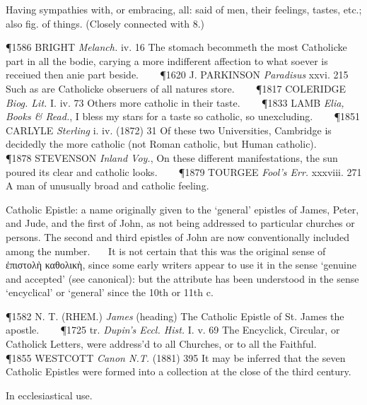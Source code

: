\begin{description}[wide, labelwidth=!, labelindent=0pt]
\begin{myenumerate}
 Having sympathies with, or embracing, all: said of men, their feelings, tastes, etc.; also fig. of things. (Closely connected with 8.)

\P 1586 BRIGHT  \textit{Melanch.} iv. 16 The stomach becommeth the most Catholicke part in all the bodie, carying a more indifferent affection to what soever is receiued then anie part beside.    
\P 1620 J. PARKINSON  \textit{Paradisus} xxvi. 215 Such as are Catholicke obseruers of all natures store.    
\P 1817 COLERIDGE  \textit{Biog. Lit.} I. iv. 73 Others more catholic in their taste.    
\P 1833 LAMB  \textit{Elia, Books \& Read.}, I bless my stars for a taste so catholic, so unexcluding.    
\P 1851 CARLYLE  \textit{Sterling} i. iv. (1872) 31 Of these two Universities, Cambridge is decidedly the more catholic (not Roman catholic, but Human catholic).    
\P 1878 STEVENSON  \textit{Inland Voy.}, On these different manifestations, the sun poured its clear and catholic looks.    
\P 1879 TOURGEE  \textit{Fool's Err.} xxxviii. 271 A man of unusually broad and catholic feeling.

 Catholic Epistle: a name originally given to the ‘general’ epistles of James, Peter, and Jude, and the first of John, as not being addressed to particular churches or persons. The second and third epistles of John are now conventionally included among the number.
   It is not certain that this was the original sense of ἐπιστολὴ καθολικὴ, since some early writers appear to use it in the sense ‘genuine and accepted’ (see canonical): but the attribute has been understood in the sense ‘encyclical’ or ‘general’ since the 10th or 11th c.

\P 1582 N. T. (RHEM.)  \textit{James} (heading) The Catholic Epistle of St. James the apostle.    
\P 1725 tr. \textit{Dupin's Eccl. Hist.} I. v. 69 The Encyclick, Circular, or Catholick Letters, were address'd to all Churches, or to all the Faithful.    
\P 1855 WESTCOTT  \textit{Canon N.T.} (1881) 395 It may be inferred that the seven Catholic Epistles were formed into a collection at the close of the third century.

 In ecclesiastical use.


\end{myenumerate}
\end{description}
